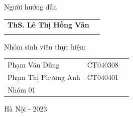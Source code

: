 \begin{titlepage}
\begin{flushleft}
		\hspace{3cm}Người hướng dẫn
		
		\begin{tabular}{l c}
			
			\hspace{4cm}\textbf{ThS. Lê Thị Hồng Vân} \\
			\hspace{4cm}{Khoa công nghệ thông tin - Học viện Kỹ thuật Mật mã}
			
			
		\end{tabular}
		
		\vspace{0.5cm}
		
		\hspace{3cm}Nhóm sinh viên thực hiện:
		
		\begin{tabular}{l c c}
			
			\hspace{4cm}Phạm Văn Dũng & CT040308 \\
						
			\hspace{4cm}Phạm Thị Phương Anh & CT040401 \\
			
			\hspace{4cm}Nhóm 01
			
			
		\end{tabular}
		
	\end{flushleft}
	
	\begin{center}
		
		\vspace{1cm}
		
		Hà Nội - 2023
		
	\end{center}
\end{titlepage}